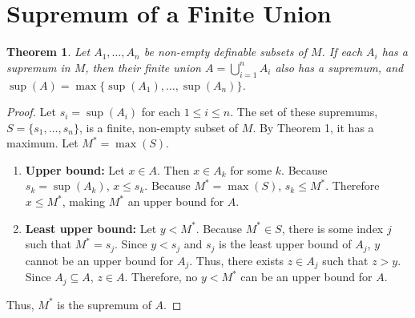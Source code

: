 \documentclass[12pt]{article}
\newtheorem{theorem}{Theorem}
\begin{document}
\section{Supremum of a Finite Union}
\begin{theorem}
Let $A_1, \dots, A_n$ be non-empty definable subsets of $M$. If each $A_i$ has a supremum in $M$, then their finite union $A = \bigcup_{i=1}^n A_i$ also has a supremum, and $\sup(A) = \max\{\sup(A_1), \dots, \sup(A_n)\}$.
\end{theorem}
\begin{proof}
Let $s_i = \sup(A_i)$ for each $1 \le i \le n$. The set of these supremums, $S = \{s_1, \dots, s_n\}$, is a finite, non-empty subset of $M$. By Theorem 1, it has a maximum. Let $M^* = \max(S)$.

\begin{enumerate}
    \item \textbf{Upper bound:} Let $x \in A$. Then $x \in A_k$ for some $k$. Because $s_k = \sup(A_k)$, $x \le s_k$. Because $M^* = \max(S)$, $s_k \le M^*$. Therefore $x \le M^*$, making $M^*$ an upper bound for $A$.
    \item \textbf{Least upper bound:} Let $y < M^*$. Because $M^* \in S$, there is some index $j$ such that $M^* = s_j$. Since $y < s_j$ and $s_j$ is the least upper bound of $A_j$, $y$ cannot be an upper bound for $A_j$. Thus, there exists $z \in A_j$ such that $z > y$. Since $A_j \subseteq A$, $z \in A$. Therefore, no $y < M^*$ can be an upper bound for $A$.
\end{enumerate}

Thus, $M^*$ is the supremum of $A$.
\end{proof}
\end{document}
